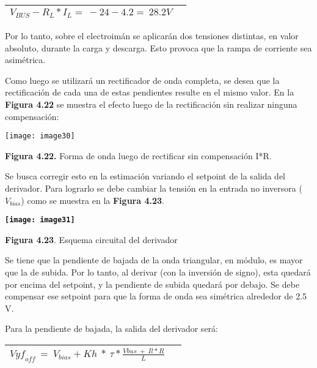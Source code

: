 \documentclass{article} %
\begin{document}
\noindent 

\begin{tabular}{|p{3.9in}|p{0.5in}|} \hline 
$V_{BUS}-R_L*I_L=\ -24-4.2=\ 28.2V$ &  \\ \hline 
\end{tabular}



\noindent Por lo tanto, sobre el electroim\'{a}n se aplicar\'{a}n dos tensiones distintas, en valor absoluto, durante la carga y descarga. Esto provoca que la rampa de corriente sea asim\'{e}trica.

\noindent 

\noindent Como luego se utilizar\'{a} un rectificador de onda completa, se desea que la rectificaci\'{o}n de cada una de estas pendientes resulte en el mismo valor. En la \textbf{Figura 4.22 }se muestra el efecto luego de la rectificaci\'{o}n sin realizar ninguna compensaci\'{o}n:

\noindent 

\noindent \texttt{[image: image30]}

\noindent \textbf{Figura 4.22.} Forma de onda luego de rectificar sin compensaci\'{o}n I*R.

\noindent 

\noindent Se busca corregir esto en la estimaci\'{o}n variando el setpoint de la salida del derivador. Para lograrlo se debe cambiar la tensi\'{o}n en la entrada no inversora ($V_{bias}$) como se muestra en la \textbf{Figura 4.23}. 

\noindent 

\noindent \textbf{\texttt{[image: image31]}}

\noindent \textbf{Figura 4.23}. Esquema circuital del derivador

\noindent 

\noindent Se tiene que la pendiente de bajada de la onda triangular, en m\'{o}dulo, es mayor que la de subida. Por lo tanto, al derivar (con la inversi\'{o}n de signo), esta quedar\'{a} por encima del setpoint, y la pendiente de subida quedar\'{a} por debajo. Se debe compensar ese setpoint para que la forma de onda sea sim\'{e}trica alrededor de 2.5 V. 

\noindent 

\noindent Para la pendiente de bajada, la salida del derivador ser\'{a}:

\noindent 

\begin{tabular}{|p{3.9in}|p{0.4in}|} \hline 
${Vyf}_{off}\ =\ V_{bias}+Kh\ *\ \tau *\frac{Vbus\ +\ Il*R}{L}\ $ &   \\ \hline 
\end{tabular}
\end{document}
